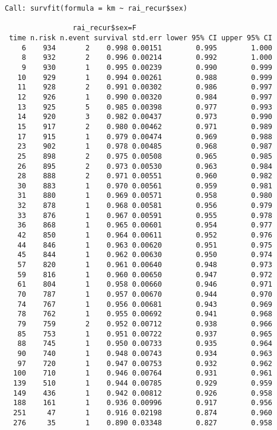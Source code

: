 \documentclass[
  letterpaper,
  DIV=11,
  numbers=noendperiod]{scrartcl}
\begin{document}
\begin{verbatim}
Call: survfit(formula = km ~ rai_recur$sex)

                rai_recur$sex=F 
 time n.risk n.event survival std.err lower 95% CI upper 95% CI
    6    934       2    0.998 0.00151        0.995        1.000
    8    932       2    0.996 0.00214        0.992        1.000
    9    930       1    0.995 0.00239        0.990        0.999
   10    929       1    0.994 0.00261        0.988        0.999
   11    928       2    0.991 0.00302        0.986        0.997
   12    926       1    0.990 0.00320        0.984        0.997
   13    925       5    0.985 0.00398        0.977        0.993
   14    920       3    0.982 0.00437        0.973        0.990
   15    917       2    0.980 0.00462        0.971        0.989
   17    915       1    0.979 0.00474        0.969        0.988
   23    902       1    0.978 0.00485        0.968        0.987
   25    898       2    0.975 0.00508        0.965        0.985
   26    895       2    0.973 0.00530        0.963        0.984
   28    888       2    0.971 0.00551        0.960        0.982
   30    883       1    0.970 0.00561        0.959        0.981
   31    880       1    0.969 0.00571        0.958        0.980
   32    878       1    0.968 0.00581        0.956        0.979
   33    876       1    0.967 0.00591        0.955        0.978
   36    868       1    0.965 0.00601        0.954        0.977
   42    850       1    0.964 0.00611        0.952        0.976
   44    846       1    0.963 0.00620        0.951        0.975
   45    844       1    0.962 0.00630        0.950        0.974
   57    820       1    0.961 0.00640        0.948        0.973
   59    816       1    0.960 0.00650        0.947        0.972
   61    804       1    0.958 0.00660        0.946        0.971
   70    787       1    0.957 0.00670        0.944        0.970
   74    767       1    0.956 0.00681        0.943        0.969
   78    762       1    0.955 0.00692        0.941        0.968
   79    759       2    0.952 0.00712        0.938        0.966
   85    753       1    0.951 0.00722        0.937        0.965
   88    745       1    0.950 0.00733        0.935        0.964
   90    740       1    0.948 0.00743        0.934        0.963
   97    720       1    0.947 0.00753        0.932        0.962
  100    710       1    0.946 0.00764        0.931        0.961
  139    510       1    0.944 0.00785        0.929        0.959
  149    436       1    0.942 0.00812        0.926        0.958
  188    161       1    0.936 0.00996        0.917        0.956
  251     47       1    0.916 0.02198        0.874        0.960
  276     35       1    0.890 0.03348        0.827        0.958


\end{verbatim}
\end{document}
